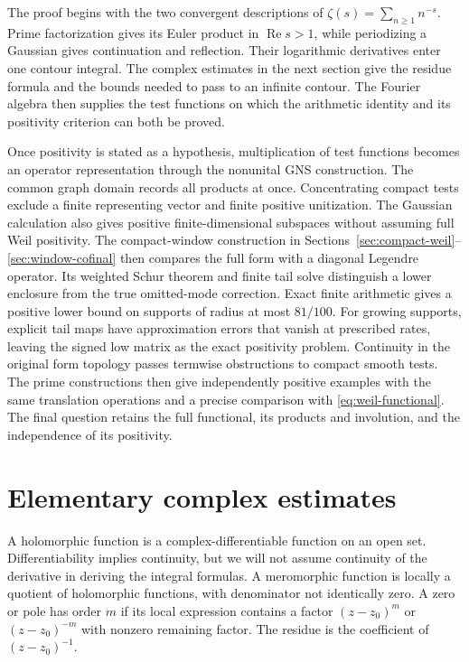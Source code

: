 \documentclass[11pt]{article}
\theoremstyle{definition}
\theoremstyle{remark}
\numberwithin{equation}{section}
\begin{document}
The proof begins with the two convergent descriptions of
\(\zeta(s)=\sum_{n\geq1}n^{-s}\).  Prime factorization gives its Euler
product in \(\operatorname{Re}s>1\), while periodizing a Gaussian gives
continuation and reflection.  Their logarithmic derivatives enter one
contour integral.  The complex estimates in the next section give the
residue formula and the bounds needed to pass to an infinite contour.
The Fourier algebra then supplies the test functions on which the
arithmetic identity and its positivity criterion can both be proved.

Once positivity is stated as a hypothesis, multiplication of test
functions becomes an operator representation through the nonunital GNS
construction.  The common graph domain records all products at once.
Concentrating compact tests exclude a finite representing vector and
finite positive unitization.  The Gaussian calculation also gives
positive finite-dimensional subspaces without assuming full Weil positivity.
The compact-window construction in Sections~\ref{sec:compact-weil}--\ref{sec:window-cofinal}
then compares the full form with a diagonal Legendre operator.  Its
weighted Schur theorem and finite tail solve distinguish a lower
enclosure from the true omitted-mode correction.  Exact finite arithmetic
gives a positive lower bound on supports of radius at most $81/100$.
For growing supports, explicit tail maps have approximation errors that
vanish at prescribed rates, leaving the signed
low matrix as the exact positivity problem.  Continuity in the original
form topology passes termwise obstructions to compact smooth tests.
The prime constructions
then give independently positive examples with the same translation
operations and a precise comparison with \eqref{eq:weil-functional}.
The final question retains the full functional, its products and
involution, and the independence of its positivity.


\section{Elementary complex estimates}
\label{sec:complex}

A holomorphic function is a complex-differentiable function on an open set.
Differentiability implies continuity, but we will not assume continuity
of the derivative in deriving the integral formulas.
A meromorphic function is locally a quotient of holomorphic functions,
with denominator not identically zero.
A zero or pole has order $m$ if its local expression contains a factor
$(z-z_0)^m$ or $(z-z_0)^{-m}$ with nonzero remaining factor.
The residue is the coefficient of $(z-z_0)^{-1}$.
\end{document}
